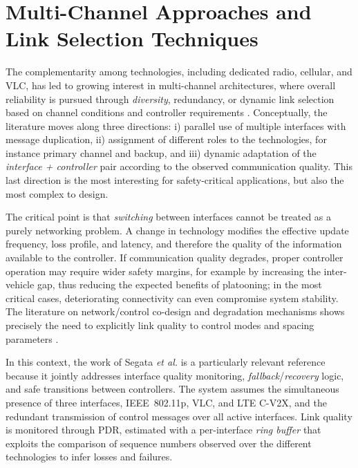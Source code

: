 \section{Multi-Channel Approaches and Link Selection Techniques}
\label{sec:sota_multichannel}

The complementarity among technologies, including dedicated radio, cellular, and VLC, has led to growing interest in multi-channel architectures, where overall reliability is pursued through \emph{diversity}, redundancy, or dynamic link selection based on channel conditions and controller requirements \cite{hardes2019communication,ishihara2015improving,segata2016platooning}. Conceptually, the literature moves along three directions: i) parallel use of multiple interfaces with message duplication, ii) assignment of different roles to the technologies, for instance primary channel and backup, and iii) dynamic adaptation of the \emph{interface + controller} pair according to the observed communication quality. This last direction is the most interesting for safety-critical applications, but also the most complex to design.

The critical point is that \emph{switching} between interfaces cannot be treated as a purely networking problem. A change in technology modifies the effective update frequency, loss profile, and latency, and therefore the quality of the information available to the controller. If communication quality degrades, proper controller operation may require wider safety margins, for example by increasing the inter-vehicle gap, thus reducing the expected benefits of platooning; in the most critical cases, deteriorating connectivity can even compromise system stability. The literature on network/control co-design and degradation mechanisms shows precisely the need to explicitly link quality to control modes and spacing parameters \cite{giordano2019joint,ploeg2015graceful}.

In this context, the work of Segata \emph{et al.} \cite{segata2023multi-technology} is a particularly relevant reference because it jointly addresses interface quality monitoring, \emph{fallback}/\emph{recovery} logic, and safe transitions between controllers. The system assumes the simultaneous presence of three interfaces, IEEE~802.11p, VLC, and LTE C-V2X, and the redundant transmission of control messages over all active interfaces. Link quality is monitored through PDR, estimated with a per-interface \emph{ring buffer} that exploits the comparison of sequence numbers observed over the different technologies to infer losses and failures.

